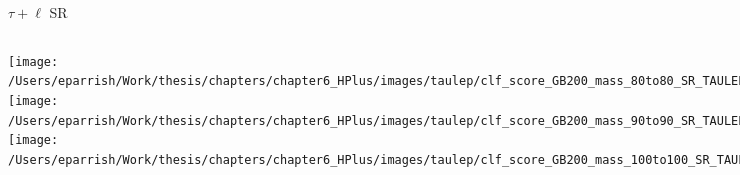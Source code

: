 \documentclass[aspectratio=169,xcolor=table]{beamer}
\begin{document}
    \begin{frame}[t]{$\tau+\ell$ SR}
      \begin{columns}[t]
          \texttt{[image: /Users/eparrish/Work/thesis/chapters/chapter6\_HPlus/images/taulep/clf\_score\_GB200\_mass\_80to80\_SR\_TAULEP.png]}
          \texttt{[image: /Users/eparrish/Work/thesis/chapters/chapter6\_HPlus/images/taulep/clf\_score\_GB200\_mass\_90to90\_SR\_TAULEP.png]}
          \texttt{[image: /Users/eparrish/Work/thesis/chapters/chapter6\_HPlus/images/taulep/clf\_score\_GB200\_mass\_100to100\_SR\_TAULEP.png]}

          \texttt{[image: /Users/eparrish/Work/thesis/chapters/chapter6\_HPlus/images/taulep/clf\_score\_GB200\_mass\_110to110\_SR\_TAULEP.png]}
          \texttt{[image: /Users/eparrish/Work/thesis/chapters/chapter6\_HPlus/images/taulep/clf\_score\_GB200\_mass\_120to120\_SR\_TAULEP.png]}
          \texttt{[image: /Users/eparrish/Work/thesis/chapters/chapter6\_HPlus/images/taulep/clf\_score\_GB200\_mass\_130to130\_SR\_TAULEP.png]}
          \texttt{[image: /Users/eparrish/Work/thesis/chapters/chapter6\_HPlus/images/taulep/clf\_score\_GB200\_mass\_140to140\_SR\_TAULEP.png]}
          \texttt{[image: /Users/eparrish/Work/thesis/chapters/chapter6\_HPlus/images/taulep/clf\_score\_GB200\_mass\_150to150\_SR\_TAULEP.png]}
          \texttt{[image: /Users/eparrish/Work/thesis/chapters/chapter6\_HPlus/images/taulep/clf\_score\_GB200\_mass\_160to160\_SR\_TAULEP.png]}

          \texttt{[image: /Users/eparrish/Work/thesis/chapters/chapter6\_HPlus/images/taulep/clf\_score\_GB200\_mass\_170to170\_SR\_TAULEP.png]}
          \texttt{[image: /Users/eparrish/Work/thesis/chapters/chapter6\_HPlus/images/taulep/clf\_score\_GB200\_mass\_180to180\_SR\_TAULEP.png]}
          \texttt{[image: /Users/eparrish/Work/thesis/chapters/chapter6\_HPlus/images/taulep/clf\_score\_GB200\_mass\_190to190\_SR\_TAULEP.png]}

      \end{columns}
    \end{frame}
\end{document}
